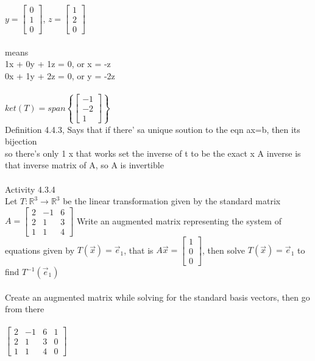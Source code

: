 \documentclass{article}
\begin{document}
$y = \begin{bmatrix} 0 \\ 1 \\ 0 \end{bmatrix}$,
$z = \begin{bmatrix} 1 \\ 2 \\ 0 \end{bmatrix}$\\
\\
means \\
1x + 0y + 1z = 0, or x = -z \\
0x + 1y + 2z = 0, or y = -2z\\
\\
$ket(T) = span\left\{\begin{bmatrix} -1 \\ -2 \\ 1 \end{bmatrix}\right\}$
\\
Definition 4.4.3, Says that if there' sa unique soution to the eqn ax=b, then its bijection\\
so there's only 1 x that works
set the inverse of t to be the exact x
A inverse is that inverse matrix of A, so A is invertible\\
\\
Activity 4.3.4\\
Let $T: \mathbb{R}^3 \to \mathbb{R}^3$ be the linear transformation given by the standard matrix $A = \begin{bmatrix} 
2 & -1 & 6 \\ 
2 & 1 & 3 \\
1 & 1 & 4 
\end{bmatrix}$ Write an augmented matrix representing the system of equations given by $T(\vec{x}) = \vec{e}_1$, that is $A\vec{x} = \begin{bmatrix} 1\\0\\0 \end{bmatrix}$, then solve $T(\vec{x}) = \vec{e}_1$ to find $T^{-1}(\vec{e}_1)$\\
\\
Create an augmented matrix while solving for the standard basis vectors, then go from there\\
\\

$\begin{bmatrix} 
2 & -1 & 6 & 1\\ 
2 & 1 & 3 & 0\\
1 & 1 & 4 & 0
\end{bmatrix}$
\end{document}
